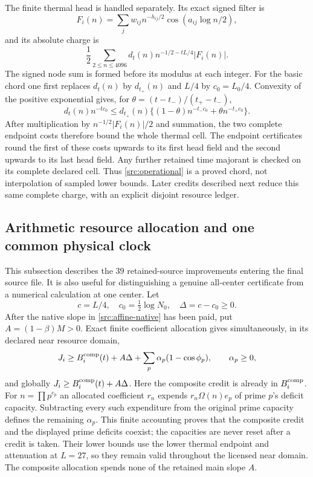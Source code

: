 \documentclass[11pt,a4paper]{article}
\theoremstyle{definition}
\theoremstyle{remark}
\begin{document}
The finite thermal head is handled separately.  Its exact signed filter
is
\[
 F_i(n)=\sum_jw_{ij}n^{-h_{ij}/2}
                              \cos(a_{ij}\log n/2),
\]
and its absolute charge is
\begin{equation}
 \frac12\sum_{2\leq n\leq4096}
       d_t(n)n^{-1/2-tL/4}|F_i(n)|.
 \label{src:head-filter}
\end{equation}
The signed node sum is formed before its modulus at each integer.
For the basic chord one first replaces $d_t(n)$ by
$d_{t_+}(n)$ and $L/4$ by $c_0=L_0/4$.  Convexity of the positive
exponential gives, for $\theta=(t-t_-)/(t_+-t_-)$,
\[
 d_t(n)n^{-tc_0}\leq d_{t_+}(n)
 \{(1-\theta)n^{-t_-c_0}+\theta n^{-t_+c_0}\}.
\]
After multiplication by $n^{-1/2}|F_i(n)|/2$ and summation, the two
complete endpoint costs therefore bound the whole thermal cell.
The endpoint certificates round the first of these costs upwards to
its first head field and the second upwards to its last head field.
Any further retained time majorant is checked on its complete declared
cell.  Thus \eqref{src:operational} is a proved chord, not interpolation
of sampled lower bounds.  Later credits described next reduce this
same complete charge, with an explicit disjoint resource ledger.

\subsection{Arithmetic resource allocation and one common physical clock}
\label{src:clock}

This subsection describes the $39$ retained-source improvements entering
the final source file.  It is also useful for distinguishing a genuine
all-center certificate from a numerical calculation at one center.
Let
\[
 c=L/4,\quad c_0=\tfrac12\log N_0,\quad\Delta=c-c_0\geq0.
\]
After the native slope in \eqref{src:affine-native} has been paid, put
$A=(1-\beta)M>0$.  Exact finite coefficient allocation gives
simultaneously, in its declared near resource domain,
\begin{equation}
 J_i\geq B_i^{\rm comp}(t)+A\Delta
                   +\sum_p\alpha_p(1-\cos\phi_p),
 \qquad \alpha_p\geq0,
 \label{src:resource}
\end{equation}
and globally $J_i\geq B_i^{\rm comp}(t)+A\Delta$.
Here the composite credit is already in $B_i^{\rm comp}$.
For $n=\prod p^{e_p}$ an allocated coefficient $r_n$ expends
$r_n\Omega(n)e_p$ of prime $p$'s deficit capacity.  Subtracting every
such expenditure from the original prime capacity defines the remaining
$\alpha_p$.  This finite accounting proves that the composite credit
and the displayed prime deficits coexist; the capacities are never
reset after a credit is taken.  Their lower bounds use the lower thermal
endpoint and attenuation at $L=27$, so they remain valid throughout
the licensed near domain.  The composite allocation spends none of
the retained main slope $A$.
\end{document}
